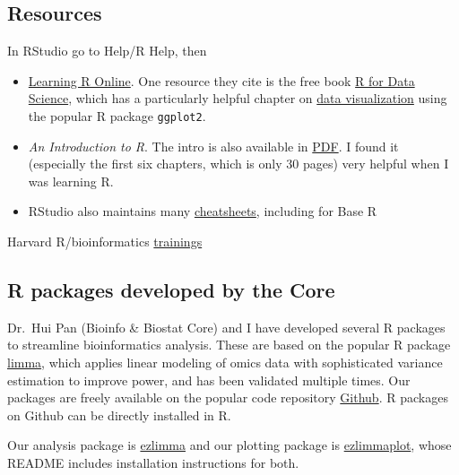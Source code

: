 \documentclass[]{article}
\providecommand{\tightlist}{%
  \setlength{\itemsep}{0pt}\setlength{\parskip}{0pt}}
\begin{document}
\subsection{Resources}\label{resources}

In RStudio go to Help/R Help, then

\begin{itemize}
\tightlist
\item
  \href{https://www.rstudio.com/online-learning/}{Learning R Online}.
  One resource they cite is the free book
  \href{https://r4ds.had.co.nz/}{R for Data Science}, which has a
  particularly helpful chapter on
  \href{https://r4ds.had.co.nz/data-visualisation.html}{data
  visualization} using the popular R package \texttt{ggplot2}.\\
\item
  \emph{An Introduction to R}. The intro is also available in
  \href{http://cran.r-project.org/doc/manuals/R-intro.pdf}{PDF}. I found
  it (especially the first six chapters, which is only 30 pages) very
  helpful when I was learning R.\\
\item
  RStudio also maintains many
  \href{https://www.rstudio.com/resources/cheatsheets/}{cheatsheets},
  including for Base R
\end{itemize}

Harvard R/bioinformatics
\href{http://bioinformatics.sph.harvard.edu/training/}{trainings}

\subsection{R packages developed by the
Core}\label{r-packages-developed-by-the-core}

Dr.~Hui Pan (Bioinfo \& Biostat Core) and I have developed several R
packages to streamline bioinformatics analysis. These are based on the
popular R package
\href{https://www.ncbi.nlm.nih.gov/pmc/articles/PMC4402510/}{limma},
which applies linear modeling of omics data with sophisticated variance
estimation to improve power, and has been validated multiple times. Our
packages are freely available on the popular code repository
\href{https://github.com/}{Github}. R packages on Github can be directly
installed in R.

Our analysis package is
\href{https://github.com/jdreyf/ezlimma}{ezlimma} and our plotting
package is \href{https://github.com/jdreyf/ezlimmaplot}{ezlimmaplot},
whose README includes installation instructions for both.
\end{document}
